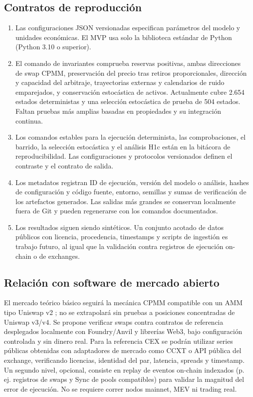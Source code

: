 \subsection{Contratos de reproducción}

\begin{enumerate}
  \item Las configuraciones JSON versionadas especifican parámetros del modelo y
    unidades económicas. El MVP usa solo la biblioteca estándar de Python (Python 3.10
    o superior).
  \item El comando de invariantes comprueba reservas positivas, ambas direcciones de
    swap CPMM, preservación del precio tras retiros proporcionales, dirección y capacidad
    del arbitraje, trayectorias externas y calendarios de ruido emparejados, y conservación
    estocástica de activos. Actualmente cubre 2.654 estados deterministas y una selección
    estocástica de prueba de 504 estados. Faltan pruebas más amplias basadas en
    propiedades y su integración continua.
  \item Los comandos estables para la ejecución determinista, las comprobaciones, el
    barrido, la selección estocástica y el análisis H1c están en la bitácora de
    reproducibilidad. Las configuraciones y protocolos versionados definen el contraste
    y el contrato de salida.
  \item Los metadatos registran ID de ejecución, versión del modelo o análisis, hashes
    de configuración y código fuente, entorno, semillas y sumas de verificación de los
    artefactos generados. Las salidas más grandes se conservan localmente fuera de Git y
    pueden regenerarse con los comandos documentados.
  \item Los resultados siguen siendo sintéticos. Un conjunto acotado de datos públicos
    con licencia, procedencia, timestamps y scripts de ingestión es trabajo futuro, al
    igual que la validación contra registros de ejecución on-chain o de exchanges.
\end{enumerate}

\subsection{Relación con software de mercado abierto}

El mercado teórico básico seguirá la mecánica CPMM compatible con un AMM tipo
Uniswap v2 \cite{adams2020uniswap,angeris2020cfmm}; no se extrapolará sin pruebas a
posiciones concentradas de Uniswap v3/v4. Se propone verificar swaps contra contratos
de referencia desplegados localmente con Foundry/Anvil y librerías Web3, bajo
configuración controlada y sin dinero real. Para la referencia CEX se podrán utilizar
series públicas obtenidas con adaptadores de mercado como CCXT o API pública del
exchange, verificando licencias, identidad del par, latencia, spreads y timestamp. Un
segundo nivel, opcional, consiste en replay de eventos on-chain indexados (p. ej.
registros de swaps y Sync de pools compatibles) para validar la magnitud del error de
ejecución. No se requiere correr nodos mainnet, MEV ni trading real.
